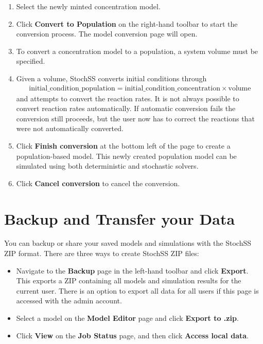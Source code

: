 \begin{enumerate}
  \item Select the newly minted concentration model.
  \item Click \textbf{Convert to Population} on the right-hand toolbar to start the conversion process. The model conversion page will open.
  \item To convert a concentration model to a population, a system volume must be specified.
  \item Given a volume, StochSS converts initial conditions through 
  \begin{align}
  \mathrm{initial\_condition\_population} = \mathrm{initial\_condition\_concentration}\times\mathrm{volume}
  \end{align}
   and attempts to convert the reaction rates. It is not always possible to convert reaction rates automatically. If automatic conversion fails the conversion still proceeds, but the user now has to correct the reactions that were not automatically converted.
  \item Click \textbf{Finish conversion} at the bottom left of the page to create a population-based model. This newly created population model can be simulated using both deterministic and stochastic solvers.
  \item Click \textbf{Cancel conversion} to cancel the conversion.
\end{enumerate}


\section{Backup and Transfer your Data}
You can backup or share your saved models and simulations with the StochSS ZIP format. There are three ways to create StochSS ZIP files:

\begin{itemize}
\item Navigate to the \textbf{Backup} page in the left-hand toolbar and click \textbf{Export}. This exports a ZIP containing all models and simulation results for the current user. There is an option to export all data for all users if this page is accessed with the admin account.
\item Select a model on the \textbf{Model Editor} page and click \textbf{Export to .zip}.
\item Click \textbf{View} on the \textbf{Job Status} page, and then click \textbf{Access local data}.
\end{itemize}

